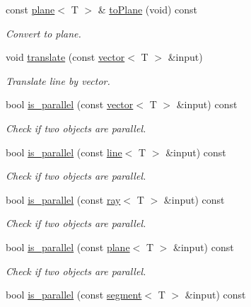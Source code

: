 \begin{DoxyCompactItemize}
\mbox{\label{classddd_1_1ray_a19f2040289cee7b67abe9520522909a5}} 
const \hyperlink{classddd_1_1plane}{plane}$<$ T $>$ \& \hyperlink{classddd_1_1ray_a19f2040289cee7b67abe9520522909a5}{to\+Plane} (void) const
\begin{DoxyCompactList}\small\item\em Convert to plane. \end{DoxyCompactList}\item 
void \hyperlink{classddd_1_1ray_a705a8f1ab49b183b03a42e097bd40649}{translate} (const \hyperlink{classddd_1_1vector}{vector}$<$ T $>$ \&input)
\begin{DoxyCompactList}\small\item\em Translate line by vector. \end{DoxyCompactList}\item 
bool \hyperlink{classddd_1_1ray_aef973f5cd8130d1753b0059921e52649}{is\+\_\+parallel} (const \hyperlink{classddd_1_1vector}{vector}$<$ T $>$ \&input) const
\begin{DoxyCompactList}\small\item\em Check if two objects are parallel. \end{DoxyCompactList}\item 
bool \hyperlink{classddd_1_1ray_a2816e672b87910165cbcc6ed33414454}{is\+\_\+parallel} (const \hyperlink{classddd_1_1line}{line}$<$ T $>$ \&input) const
\begin{DoxyCompactList}\small\item\em Check if two objects are parallel. \end{DoxyCompactList}\item 
bool \hyperlink{classddd_1_1ray_ac17fe4f977e57135cff60d1b152fafb9}{is\+\_\+parallel} (const \hyperlink{classddd_1_1ray}{ray}$<$ T $>$ \&input) const
\begin{DoxyCompactList}\small\item\em Check if two objects are parallel. \end{DoxyCompactList}\item 
bool \hyperlink{classddd_1_1ray_abdbac6d010838f2cd59f877e6ed1fd48}{is\+\_\+parallel} (const \hyperlink{classddd_1_1plane}{plane}$<$ T $>$ \&input) const
\begin{DoxyCompactList}\small\item\em Check if two objects are parallel. \end{DoxyCompactList}\item 
bool \hyperlink{classddd_1_1ray_add0ec87a055dcea770c010709092a651}{is\+\_\+parallel} (const \hyperlink{classddd_1_1segment}{segment}$<$ T $>$ \&input) const

\end{DoxyCompactItemize}
